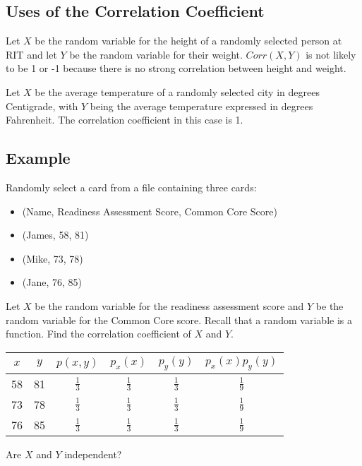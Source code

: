 \documentclass{math}
\begin{document}
\subsection*{Uses of the Correlation Coefficient}
Let \( X \) be the random variable for the height of a randomly selected person
at RIT and let \( Y \) be the random variable for their weight. \( Corr(X,Y) \)
is not likely to be 1 or -1 because there is no strong correlation between
height and weight. \par
Let \( X \) be the average temperature of a randomly selected city in degrees
Centigrade, with \( Y \) being the average temperature expressed in degrees
Fahrenheit. The correlation coefficient in this case is 1.

\subsection*{Example}
Randomly select a card from a file containing three cards:
\begin{itemize}
  \item (Name, Readiness Assessment Score, Common Core Score)
  \item (James, 58, 81)
  \item (Mike, 73, 78)
  \item (Jane, 76, 85)
\end{itemize}
Let \( X \) be the random variable for the readiness assessment score and
\( Y \) be the random variable for the Common Core score. Recall that a random
variable is a function. Find the correlation coefficient of \( X \) and \( Y \).
\begin{center}
  {\renewcommand{\arraystretch}{2}
  \begin{tabular}{|c|c|c|c|c|c|}
    \hline
    \( x \) & \( y \) & \( p(x,y) \) & \( p_{x}(x) \) & \( p_{y}(y) \) &
      \( p_{x}(x)p_{y}(y) \) \\
    \hline
    58 & 81 & \( \frac{1}{3} \) & \( \frac{1}{3} \) & \( \frac{1}{3} \) &
      \( \frac{1}{9} \) \\
    \hline
    73 & 78 & \( \frac{1}{3} \) & \( \frac{1}{3} \) & \( \frac{1}{3} \) &
      \( \frac{1}{9} \) \\
    \hline
    76 & 85 & \( \frac{1}{3} \) & \( \frac{1}{3} \) & \( \frac{1}{3} \) &
      \( \frac{1}{9} \) \\
    \hline
  \end{tabular}}
\end{center}
Are \( X \) and \( Y \) independent? \\
\end{document}
